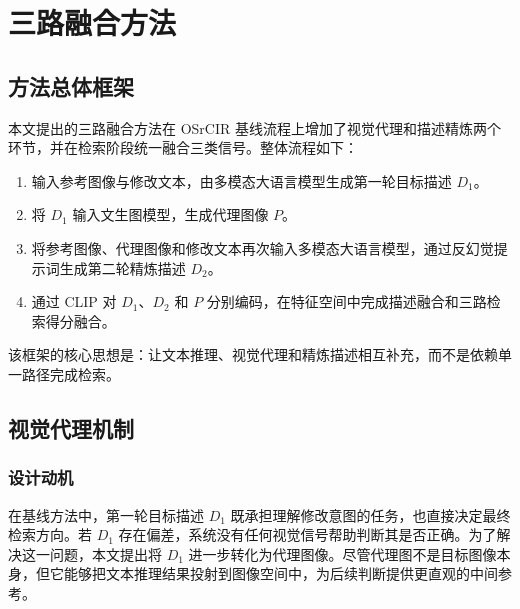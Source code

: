 \documentclass[12pt,a4paper,UTF8,oneside,openany]{ctexrep}
\providecommand{\tightlist}{%
  \setlength{\itemsep}{0pt}\setlength{\parskip}{0pt}}
\begin{document}
\hypertarget{ux4e09ux8defux878dux5408ux65b9ux6cd5}{%
\section{三路融合方法}\label{ux4e09ux8defux878dux5408ux65b9ux6cd5}}

\hypertarget{ux65b9ux6cd5ux603bux4f53ux6846ux67b6}{%
\subsection{方法总体框架}\label{ux65b9ux6cd5ux603bux4f53ux6846ux67b6}}

本文提出的三路融合方法在 OSrCIR
基线流程上增加了视觉代理和描述精炼两个环节，并在检索阶段统一融合三类信号。整体流程如下：

\begin{enumerate}
\def\labelenumi{\arabic{enumi}.}
\tightlist
\item
  输入参考图像与修改文本，由多模态大语言模型生成第一轮目标描述 \(D_1\)。
\item
  将 \(D_1\) 输入文生图模型，生成代理图像 \(P\)。
\item
  将参考图像、代理图像和修改文本再次输入多模态大语言模型，通过反幻觉提示词生成第二轮精炼描述
  \(D_2\)。
\item
  通过 CLIP 对 \(D_1\)、\(D_2\) 和 \(P\)
  分别编码，在特征空间中完成描述融合和三路检索得分融合。
\end{enumerate}

该框架的核心思想是：让文本推理、视觉代理和精炼描述相互补充，而不是依赖单一路径完成检索。

\hypertarget{ux89c6ux89c9ux4ee3ux7406ux673aux5236}{%
\subsection{视觉代理机制}\label{ux89c6ux89c9ux4ee3ux7406ux673aux5236}}

\hypertarget{ux8bbeux8ba1ux52a8ux673a}{%
\subsubsection{设计动机}\label{ux8bbeux8ba1ux52a8ux673a}}

在基线方法中，第一轮目标描述 \(D_1\)
既承担理解修改意图的任务，也直接决定最终检索方向。若 \(D_1\)
存在偏差，系统没有任何视觉信号帮助判断其是否正确。为了解决这一问题，本文提出将
\(D_1\)
进一步转化为代理图像。尽管代理图不是目标图像本身，但它能够把文本推理结果投射到图像空间中，为后续判断提供更直观的中间参考。
\end{document}
